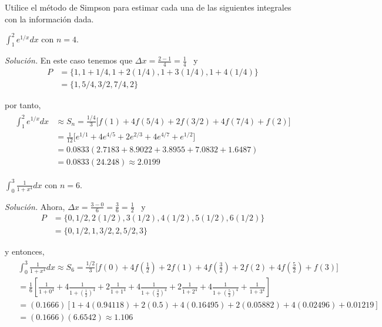 \begin{ejemplo}
  Utilice el método de Simpson para estimar cada una de las siguientes integrales con la información dada.
\end{ejemplo}
\begin{parrafonumerado}

\item $\int_{1}^{2}e^{1/x}dx$ con $n=4$.

  \emph{Solución.} En este caso tenemos que $\Delta x=\frac{2-1}{4}=\frac{1}{4}$ \ y
  \begin{align*}
    P&=\{1,1+1/4,1+2(1/4),1+3(1/4),1+4(1/4)\}\\
    &=\{1,5/4,3/2,7/4,2\}
  \end{align*}

  por tanto,
  \begin{gather*}
    \begin{aligned}
      \int_{1}^{2}e^{1/x}dx&\approx S_{n}=\frac{1/4}{3}
      \Big[f(1)+4f(5/4)+2f(3/2)+4f(7/4)+f(2)\Big]\\
      &=\frac{1}{12}\Big[ e^{1/1}+4e^{4/5}+2e^{2/3}+4e^{4/7}+e^{1/2}\Big]\\
      &=0.0833(2.7183+8.9022+3.8955+7.0832+1.6487)\\
      &=0.0833(24.248)\approx 2.0199
    \end{aligned}
  \end{gather*}

\item $\int_{0}^{3}\frac{1}{1+x^{4}}dx$ con $n=6$.

  \emph{Solución.} Ahora, $\Delta x=\frac{3-0}{6}=\frac{3}{6}=\frac{1}{2}$ \ y
  \begin{align*}
    P&=\{0,1/2,2(1/2),3(1/2),4(1/2),5(1/2),6(1/2)\}\\
    &=\{0,1/2,1,3/2,2,5/2,3\}
  \end{align*}

  y entonces,
  \begin{gather*}
    \begin{aligned}
      &\int_{0}^{3}\frac{1}{1+x^{4}}dx\approx S_{6}
      =\frac{1/2}{3}\Big[ f(0)+4f\left(\frac{1}{2}\right)+2f(1)+4f\left(\frac{3}{2}\right)+2f(2)+4f\left(\frac{5}{2}\right)
      +f(3)\Big]\\
      &=\frac{1}{6}\left[ \frac{1}{1+0^{4}}+4\frac{1}{1+(%
        \frac{1}{2})^{4}}+2\frac{1}{1+1^{4}}+4\frac{1}{1+(\frac{3}{2})^{4}}+2\frac{1%
        }{1+2^{4}}
      +4\frac{1}{1+(\frac{5}{2})^{4}}+\frac{1}{1+3^{4}}\right]\\
      &=(0.1666)\left[ 1+4(0.94118)+2(0.5)+4(0.164
        95)+2(0.05882)
      +4(0.02496)+0.01219\right]\\
      &=(0.1666)(6.6542) \approx 1.106
    \end{aligned}
  \end{gather*}


\end{parrafonumerado}
